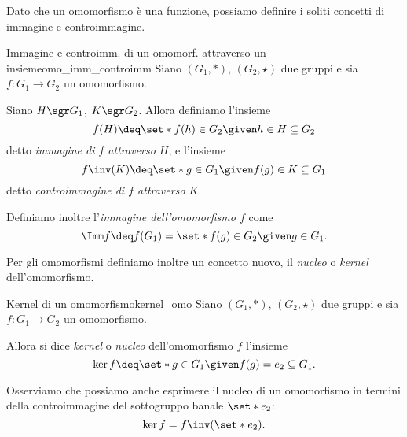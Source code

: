 Dato che un omomorfismo è una funzione, possiamo definire i soliti concetti di immagine e controimmagine.

\begin{definition}
    {Immagine e controimm. di un omomorf. attraverso un insieme}{omo_imm_controimm}
    Siano $(G_1, *)$, $(G_2, \star)$ due gruppi e sia $f : G_1 \to G_2$ un omomorfismo.

    Siano $H \sgr G_1$, $K \sgr G_2$. Allora definiamo l'insieme \[
        f(H) \deq \set*{f(h) \in G_2 \given h \in H} \subseteq G_2    
    \] detto \emph{immagine di $f$ attraverso $H$}, e l'insieme \[
        f\inv(K) \deq \set*{g \in G_1 \given f(g) \in K} \subseteq G_1
    \] detto \emph{controimmagine di $f$ attraverso $K$}.

    Definiamo inoltre l'\emph{immagine dell'omomorfismo $f$} come \[
        \Imm f \deq f(G_1) = \set*{f(g) \in G_2 \given g \in G_1}.     
    \]
\end{definition}

Per gli omomorfismi definiamo inoltre un concetto nuovo, il \emph{nucleo} o \emph{kernel} dell'omomorfismo.

\begin{definition}
    {Kernel di un omomorfismo}{kernel_omo}
    Siano $(G_1, *)$, $(G_2, \star)$ due gruppi e sia $f : G_1 \to G_2$ un omomorfismo.

    Allora si dice \emph{kernel} o \emph{nucleo} dell'omomorfismo $f$ l'insieme \[
        \ker f \deq \set*{g \in G_1 \given f(g) = e_2} \subseteq G_1.    
    \]
\end{definition}

Osserviamo che possiamo anche esprimere il nucleo di un omomorfismo in termini della controimmagine del sottogruppo banale $\set*{e_2}$: \[
    \ker f = f\inv(\set*{e_2}).
\]

